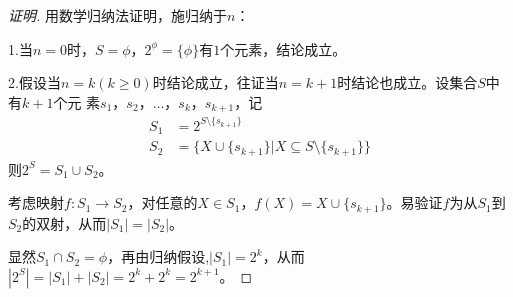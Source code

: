   \begin{proof}[证明]
    用数学归纳法证明，施归纳于$n$：

    1.当$n=0$时，$S=\phi$，$2^{\phi} = \{\phi\}$有$1$个元素，结论成立。

    2.假设当$n=k(k\geq
    0)$时结论成立，往证当$n=k+1$时结论也成立。设集合$S$中有$k+1$个元
    素$s_1$，$s_2$，$\ldots$，$s_k$，$s_{k+1}$，记
    \begin{align*}
      S_1&=2^{S\setminus \{s_{k+1}\}}\\
      S_2&=\{X\cup \{s_{k+1}\}|X\subseteq S\setminus \{s_{k+1}\}\}
    \end{align*}
    则$2^S = S_1\cup S_2$。

    考虑映射$f:S_1\to S_2$，对任意的$X\in S_1$，$f(X)=X\cup \{s_{k+1}\}$。易验证$f$为从$S_1$到$S_2$的双射，从而$|S_1|=|S_2|$。

    显然$S_1\cap S_2=\phi$，再由归纳假设,$|S_1|=2^k$，从而$|2^S|=|S_1|+|S_2|=2^k+2^k=2^{k+1}$。
    
  \end{proof}







